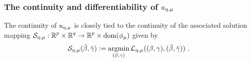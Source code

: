 

\subsubsection{The continuity and differentiability of $\uemu$}

The continuity of $\uemu$ is closely tied to the continuity of 
the associated solution mapping
$\map{\SS_\emu}{\Rp\times\Rq}{\Rp\times\dom(\phimu)}$ given by 
\begin{equation}\label{eq:argmin for u}
\SS_\emu(\tbeta,\tgam):= 
\argmin_{(\beta,\gam) } \LL_{\emu}(\bg,\tbg)\ .
\end{equation}

